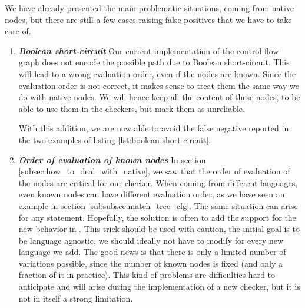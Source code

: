 We have already presented the main problematic situations, coming from native nodes, but there are still a few cases raising false positives that we have to take care of.

\begin{enumerate}
	\item \textbf{\textit{Boolean short-circuit}} \newline 
	\label{subsubsec:boolean_short_circuit}
	Our current implementation of the control flow graph does not encode the possible path due to Boolean short-circuit. 
	This will lead to a wrong evaluation order, even if the nodes are known. 
	Since the evaluation order is not correct, it makes sense to treat them the same way we do with native nodes.
	We will hence keep all the content of these nodes, to be able to use them in the checkers, but mark them as unreliable. 


	
	With this addition, we are now able to avoid the false negative reported in the two examples of listing \ref{lst:boolean-short-circuit}.
	
	\item \textbf{\textit{Order of evaluation of known nodes}} \newline 
	\label{subsubsec:evaluation_known_nodes}
	In section \ref{subsec:how_to_deal_with_native}, we saw that the order of evaluation of the nodes are critical for our checker.
	When coming from different languages, even known nodes can have different evaluation order, as we have seen an example in section \ref{subsubsec:match_tree_cfg}. 
	The same situation can arise for any statement.
	Hopefully, the solution is often to add the support for the new behavior in \slang{}.
	This trick should be used with caution, the initial goal is to be language agnostic, we should ideally not have to modify \slang{} for every new language we add. 
	The good news is that there is only a limited number of variations possible, since the number of known nodes is fixed (and only a fraction of it in practice). 
	This kind of problems are difficulties hard to anticipate and will arise during the implementation of a new checker, but it is not in itself a strong limitation.
	

\end{enumerate}
